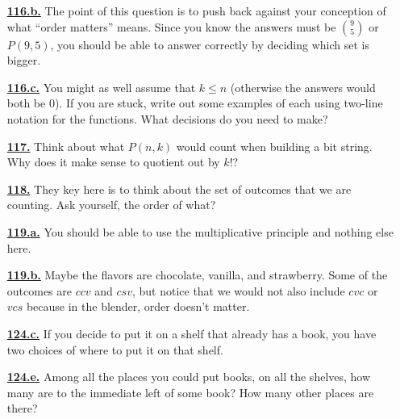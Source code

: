 \documentclass[10pt,]{book}
\theoremstyle{plain}
\theoremstyle{definition}
\theoremstyle{definition}
\theoremstyle{definition}
\numberwithin{equation}{chapter}
\begin{document}
\begin{itemize}[itemsep=1em]
\hypertarget{a-116.b}{}\item[\textbf{\hyperref[task-148]{116.b.}}]
\hypertarget{p-793}{}%
The point of this question is to push back against your conception of what ``order matters'' means.  Since you know the answers must be \(\binom{9}{5}\) or \(P(9,5)\), you should be able to answer correctly by deciding which set is bigger.%

\hypertarget{a-116.c}{}\item[\textbf{\hyperref[task-149]{116.c.}}]
\hypertarget{p-795}{}%
You might as well assume that \(k \le n\) (otherwise the answers would both be 0).  If you are stuck, write out some examples of each using two-line notation for the functions.  What decisions do you need to make?%

\hypertarget{a-117}{}\item[\textbf{\hyperref[activity-110]{117.}}]
\hypertarget{p-797}{}%
Think about what \(P(n,k)\) would count when building a bit string.  Why does it make sense to quotient out by \(k!\)?%

\hypertarget{a-118}{}\item[\textbf{\hyperref[activity-111]{118.}}]
\hypertarget{p-799}{}%
They key here is to think about the set of outcomes that we are counting.  Ask yourself, the order of what?%

\hypertarget{a-119.a}{}\item[\textbf{\hyperref[task-150]{119.a.}}]
\hypertarget{p-802}{}%
You should be able to use the multiplicative principle and nothing else here.%

\hypertarget{a-119.b}{}\item[\textbf{\hyperref[task-151]{119.b.}}]
\hypertarget{p-804}{}%
Maybe the flavors are chocolate, vanilla, and strawberry.  Some of the outcomes are \(ccv\) and \(csv\), but notice that we would not also include \(cvc\) or \(vcs\) because in the blender, order doesn't matter.%

\hypertarget{a-124.c}{}\item[\textbf{\hyperref[task-163]{124.c.}}]
\hypertarget{p-831}{}%
If you decide to put it on a shelf that already has a book, you have two choices of where to put it on that shelf.%

\hypertarget{a-124.e}{}\item[\textbf{\hyperref[task-165]{124.e.}}]
\hypertarget{p-836}{}%
Among all the places you could put books, on all the shelves, how many are to the immediate left of some book? How many other places are there?%


\end{itemize}
\end{document}
